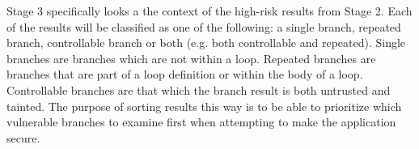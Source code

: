 \documentclass[11pt,a4paper]{article}
\begin{document}
Stage 3 specifically looks a the context of the high-risk results from Stage 2.
Each of the results will be classified as one of the following: a single branch, repeated
branch, controllable branch or both (e.g. both controllable and repeated).
Single branches are branches which are not within a loop. Repeated branches are
branches that are part of a loop definition or within the body of a loop.
Controllable branches are that which the branch result is both untrusted and
tainted. The purpose of sorting results this way is to be able to prioritize
which vulnerable branches to examine first when attempting to make the
application secure.


%
\end{document}
